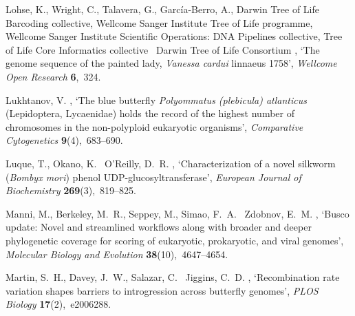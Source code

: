 \documentclass[twocolumn]{bmcart}%
\begin{document}
\begin{backmatter}
\begin{thebibliography}{xx}
Lohse, K., Wright, C., Talavera, G., García-Berro, A., {Darwin Tree of Life
  Barcoding collective}, {Wellcome Sanger Institute Tree of Life programme},
  {Wellcome Sanger Institute Scientific Operations: DNA Pipelines collective},
  {Tree of Life Core Informatics collective} \harvardand\ {Darwin Tree of Life
  Consortium}  \harvardyearright , `The genome sequence of
  the painted lady, \textit{Vanessa cardui} linnaeus 1758', {\em Wellcome Open
  Research} {\bf 6},~324.

Lukhtanov, V.  \harvardyearright , `The blue butterfly
  \textit{Polyommatus (plebicula) atlanticus} ({{Lepidoptera}}, {{Lycaenidae}})
  holds the record of the highest number of chromosomes in the non-polyploid
  eukaryotic organisms', {\em Comparative Cytogenetics} {\bf 9}(4),~683--690.

Luque, T., Okano, K. \harvardand\ O'Reilly, D.~R.  \harvardyearleft
  2002\harvardyearright , `Characterization of a novel silkworm
  (\textit{{{Bombyx}} mori}) phenol {{UDP-glucosyltransferase}}', {\em European
  Journal of Biochemistry} {\bf 269}(3),~819--825.

Manni, M., Berkeley, M.~R., Seppey, M., Simao, F.~A. \harvardand\ Zdobnov,
  E.~M.  \harvardyearleft 2021\harvardyearright , `Busco update: Novel and
  streamlined workflows along with broader and deeper phylogenetic coverage for
  scoring of eukaryotic, prokaryotic, and viral genomes', {\em Molecular
  Biology and Evolution} {\bf 38}(10),~4647--4654.

Martin, S.~H., Davey, J.~W., Salazar, C. \harvardand\ Jiggins, C.~D.
  \harvardyearleft 2019\harvardyearright , `Recombination rate variation shapes
  barriers to introgression across butterfly genomes', {\em PLOS Biology} {\bf
  17}(2),~e2006288.


\end{thebibliography}
\end{backmatter}
\end{document}
